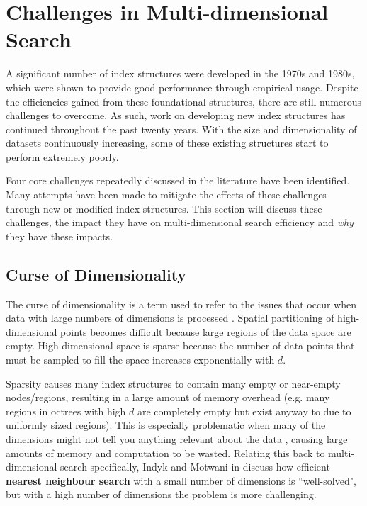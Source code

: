 \section{Challenges in Multi-dimensional Search}
\label{sec:challenges}

A significant number of index structures were developed in the 1970s and 1980s, which were shown to provide good performance through empirical usage. Despite the efficiencies gained from these foundational structures, there are still numerous challenges to overcome. As such, work on developing new index structures has continued throughout the past twenty years. With the size and dimensionality of datasets continuously increasing, some of these existing structures start to perform extremely poorly.

Four core challenges repeatedly discussed in the literature have been identified. Many attempts have been made to mitigate the effects of these challenges through new or modified index structures. This section will discuss these challenges, the impact they have on multi-dimensional search efficiency and \textit{why} they have these impacts.

\subsection{Curse of Dimensionality}
\label{sec:curse-of-dimensionality}

The curse of dimensionality is a term used to refer to the issues that occur when data with large numbers of dimensions is processed \cite{curse-of-dimensionality}. Spatial partitioning of high-dimensional points becomes difficult because large regions of the data space are empty. High-dimensional space is sparse because the number of data points that must be sampled to fill the space increases exponentially with $d$.

Sparsity causes many index structures to contain many empty or near-empty nodes/regions, resulting in a large amount of memory overhead (e.g. many regions in octrees with high $d$ are completely empty but exist anyway to due to uniformly sized regions). This is especially problematic when many of the dimensions might not tell you anything relevant about the data \cite{irrelevant-dimension}, causing large amounts of memory and computation to be wasted. Relating this back to multi-dimensional search specifically, Indyk and Motwani in \cite{knn-curse-of-dimensionality} discuss how efficient \textbf{nearest neighbour search} with a small number of dimensions is ``well-solved", but with a high number of dimensions the problem is more challenging.

